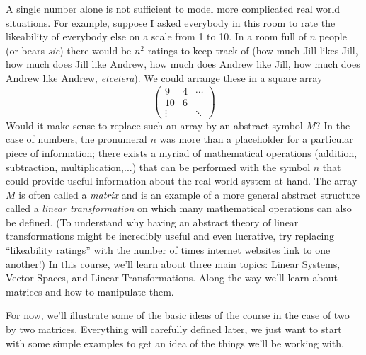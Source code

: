 {A single number alone is not sufficient to model more complicated real world situations. For example, suppose I asked everybody in this
room to rate the likeability of everybody else on a scale from 1 to 10. In a room full of $n$ people (or bears {\it sic}) there would be $n^2$ 
ratings to keep track of (how much Jill likes Jill, how much does Jill like Andrew, how much does Andrew like Jill, how much does Andrew like Andrew, {\it etcetera}). We could arrange these in a square array
\begin{equation*}
    \begin{pmatrix}
      9             &4  &\cdots\\
      10             &6 &\\
    \vdots & & \ddots      
    \end{pmatrix}
 \end{equation*}
Would it make sense to replace such an array by an abstract symbol $M$? In the case of numbers, the pronumeral $n$ was more
than a placeholder for a particular piece of information; there exists a myriad of mathematical operations (addition, subtraction, multiplication,...) that can be  performed with the symbol $n$ that could provide useful information about the real world system at hand.
The array $M$ is often called a {\it matrix} and is an example of a more general abstract structure called a {\it linear transformation}
on which many mathematical operations can also be defined.
(To understand why having an abstract theory of linear transformations might be incredibly useful and even lucrative, try replacing ``likeability ratings'' with the number of times internet websites link to one another!)
In this course, we'll learn about three main topics: Linear Systems, Vector Spaces, and Linear Transformations.  Along the way we'll learn about matrices and how to manipulate them.  

For now, we'll illustrate some of  the basic ideas of the course in the case of two by two matrices.  Everything will carefully defined later, we just want
to start with some simple examples to get an idea of the things we'll be working with.

}




